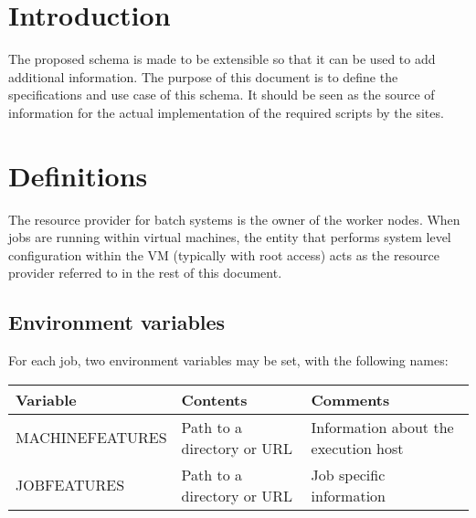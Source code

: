 \documentclass[12pt,a4paper]{article}
\begin{document}

\cleardoublepage

\renewcommand{\thefootnote}{\arabic{footnote}}
\setcounter{footnote}{0}


\pagestyle{plain} %
\setcounter{page}{1}

\linenumbers

\section{Introduction}
\label{sec:Introduction}

The proposed schema is made to be extensible so that it can be used to add
additional information. The purpose of this document is to define the
specifications and use case of this schema. It should be seen as the source
of information for the actual implementation of the required scripts by the
sites.

\section{Definitions}
\label{sec:Definitions}

The resource provider for batch systems is the owner of the worker nodes. 
When jobs are running within virtual machines, the entity that performs
system level configuration within the VM (typically with root access) acts
as the resource provider referred to in the rest of this document.

\subsection{Environment variables}
\label{sec:EnvironmentVariables}

For each job, two environment variables may be set, with the following
names:

\begin{tabular}{l l l}
Variable	& Contents		& Comments \\
\hline
MACHINEFEATURES	& Path to a directory or URL & Information about the execution host\\
JOBFEATURES	& Path to a directory or URL & Job specific information \\
\end{tabular}
\end{document}
